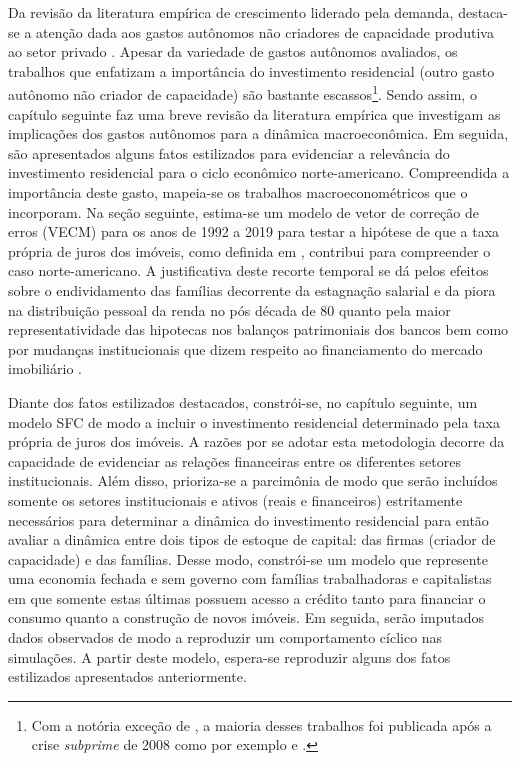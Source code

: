 Da revisão da literatura empírica de crescimento liderado pela demanda, destaca-se a atenção dada aos gastos autônomos não criadores de capacidade produtiva ao setor privado \cites{girardi_long-run_2016}{girardi_autonomous_2018}{freitas_pattern_2013}{braga_investment_2018}. Apesar da variedade de gastos autônomos avaliados, os trabalhos que enfatizam a importância do investimento residencial (outro gasto autônomo não criador de capacidade) são bastante escassos\footnote{Com a notória exceção de \textcite{leamer_housing_2007}, a maioria desses trabalhos foi publicada após a crise \textit{subprime} de 2008 como por exemplo \textcite{jorda_great_2014} e \textcite{fiebiger_semi-autonomous_2018}.}. 
Sendo assim, o capítulo seguinte faz uma breve revisão da literatura empírica que investigam as implicações dos gastos autônomos para a dinâmica macroeconômica.
Em seguida, são apresentados alguns fatos estilizados para evidenciar a relevância do investimento residencial para o ciclo econômico norte-americano.
Compreendida a importância deste gasto, mapeia-se os trabalhos macroeconométricos que o incorporam.
Na seção seguinte, estima-se um modelo de vetor de correção de erros (VECM) para os anos de 1992 a 2019 para testar a hipótese de que  a taxa própria de juros dos imóveis, como definida em \textcite{teixeira_crescimento_2015}, contribui para compreender o caso norte-americano.
A justificativa deste recorte temporal se dá pelos efeitos sobre o endividamento das famílias decorrente da estagnação salarial e da piora na distribuição pessoal da renda  no pós década de 80 \cites{barba_rising_2009}{mian_consequences_2009}{wolf_rising_2010}{teixeira_uma_2011} quanto pela maior representatividade das hipotecas nos balanços patrimoniais dos bancos \cite{jorda_great_2014} bem como por mudanças institucionais que dizem respeito ao financiamento do mercado imobiliário \cites{federal_deposit_insurance_corporation_savings_1997}{mishkin_evaluating_1997}{wall_too_2010}.


Diante dos fatos estilizados destacados, constrói-se, no capítulo seguinte, um modelo SFC de modo a incluir o investimento residencial determinado pela taxa própria de juros dos imóveis. 
A razões por se adotar esta metodologia decorre da capacidade de evidenciar as relações financeiras entre os diferentes setores institucionais. 
Além disso, prioriza-se a parcimônia de modo que serão incluídos somente os setores institucionais e ativos (reais e financeiros) estritamente necessários para determinar a dinâmica do investimento residencial para então avaliar a dinâmica entre dois tipos de estoque de capital: das firmas (criador de capacidade) e das famílias. 
Desse modo, constrói-se um modelo que represente uma economia fechada e sem governo
com famílias trabalhadoras e capitalistas em que somente estas últimas possuem acesso a crédito tanto para financiar o consumo quanto a construção de novos imóveis.
Em seguida, serão imputados dados observados de modo a reproduzir um comportamento cíclico nas simulações.
A partir deste modelo, espera-se reproduzir alguns dos fatos estilizados apresentados anteriormente.

